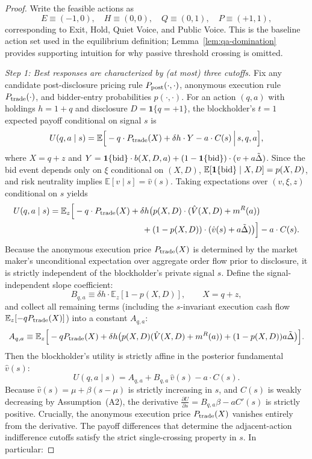 \documentclass[11pt]{article}
\newcommand{\E}{\mathbb{E}}
\newcommand{\1}{\mathbf{1}}
\begin{document}
\begin{proof}
Write the feasible actions as
\[
E\equiv(-1,0),\quad H\equiv(0,0),\quad Q\equiv(0,1),\quad P\equiv(+1,1),
\]
corresponding to Exit, Hold, Quiet Voice, and Public Voice. This is the baseline action set used in the equilibrium definition; Lemma~\ref{lem:qa-domination} provides supporting intuition for why passive threshold crossing is omitted.

\textit{Step 1: Best responses are characterized by (at most) three cutoffs.}
Fix any candidate post-disclosure pricing rule $P_{\textup{post}}(\cdot,\cdot)$, anonymous execution rule $P_{\textup{trade}}(\cdot)$, and bidder-entry probabilities $p(\cdot,\cdot)$. For an action $(q,a)$ with holdings $h=1+q$ and disclosure $D=\1\{q=+1\}$, the blockholder's $t=1$ expected payoff conditional on signal $s$ is
\[
U(q,a \mid s)
= \E\Big[-q\cdot P_{\textup{trade}}(X) + \delta h \cdot Y - a\cdot C(s) \,\Big|\, s,q,a\Big],
\]
where $X=q+z$ and $Y=\1\{\textup{bid}\}\cdot b(X,D,a) + (1-\1\{\textup{bid}\})\cdot (v+a\tilde{\Delta})$.
Since the bid event depends only on $\xi$ conditional on $(X,D)$, $\E[\1\{\textup{bid}\} \mid X,D]=p(X,D)$, and risk neutrality implies $\E[v \mid s]=\hat v(s)$. Taking expectations over $(v,\xi,z)$ conditional on $s$ yields
\begin{align*}
U(q,a \mid s)
&= \E_z\Big[-q\cdot P_{\textup{trade}}(X) + \delta h \big(p(X,D)\cdot (\hat{V}(X,D)+m^{R}(a)) \\
&\qquad\qquad\qquad\qquad\qquad\quad + (1-p(X,D))\cdot(\hat{v}(s)+a\tilde{\Delta})\big)\Big] - a\cdot C(s).
\end{align*}
Because the anonymous execution price $P_{\textup{trade}}(X)$ is determined by the market maker's unconditional expectation over aggregate order flow prior to disclosure, it is strictly independent of the blockholder's private signal $s$. Define the signal-independent slope coefficient:
\[
B_{q,a}\equiv \delta h\cdot \E_z[1-p(X,D)],\qquad X=q+z,
\]
and collect all remaining terms (including the $s$-invariant execution cash flow $\E_z[-q P_{\textup{trade}}(X)]$) into a constant $A_{q,a}$:
\[
A_{q,a} \equiv \E_z\Big[-q P_{\textup{trade}}(X) + \delta h \big( p(X,D)(\hat{V}(X,D) + m^R(a)) + (1-p(X,D))a\tilde{\Delta} \big)\Big].
\]
Then the blockholder's utility is strictly affine in the posterior fundamental $\hat{v}(s)$:
\begin{equation}
U(q,a \mid s)=A_{q,a}+B_{q,a}\,\hat{v}(s)-a\cdot C(s).
\label{eq:U-affine}
\end{equation}
Because $\hat v(s)=\mu+\beta(s-\mu)$ is strictly increasing in $s$, and $C(s)$ is weakly decreasing by Assumption~\textup{(A2)}, the derivative $\frac{\partial U}{\partial s} = B_{q,a}\beta - a C'(s)$ is strictly positive. Crucially, the anonymous execution price $P_{\textup{trade}}(X)$ vanishes entirely from the derivative. The payoff differences that determine the adjacent-action indifference cutoffs satisfy the strict single-crossing property in $s$. In particular:

\end{proof}
\end{document}
